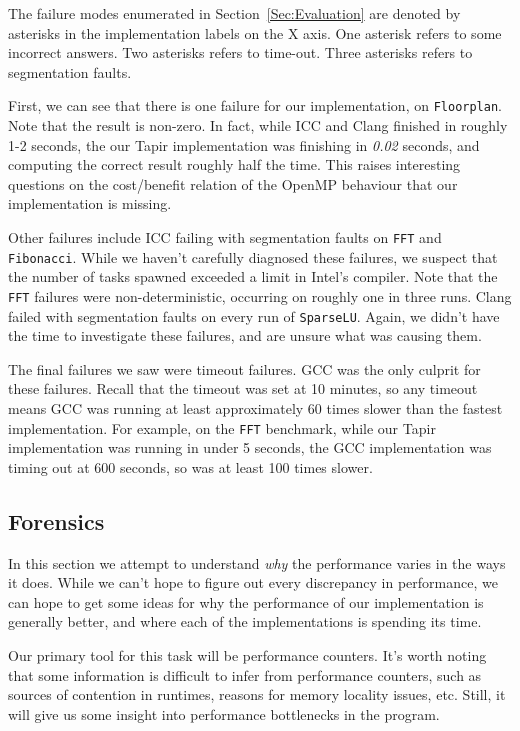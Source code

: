 \documentclass[sigconf]{acmart}
\begin{document}
The failure modes enumerated in Section~\ref{Sec:Evaluation} are denoted by 
asterisks in the implementation labels on the X axis. One asterisk refers to
some incorrect answers. Two asterisks refers to time-out. Three asterisks
refers to segmentation faults.

First, we can see that there is one failure for our implementation, on
\texttt{Floorplan}. Note that the result is non-zero. In fact, while ICC and
Clang finished in roughly 1-2 seconds, the our Tapir implementation was
finishing in \emph{0.02} seconds, and computing the correct result roughly half
the time. This raises interesting questions on the cost/benefit relation of the
OpenMP behaviour that our implementation is missing.

Other failures include ICC failing with segmentation faults on \texttt{FFT} and
\texttt{Fibonacci}. While we haven't carefully diagnosed these failures, we 
suspect that the number of tasks spawned exceeded a limit in Intel's compiler.
Note that the \texttt{FFT} failures were non-deterministic, occurring on
roughly one in three runs. Clang failed with segmentation faults on every run 
of \texttt{SparseLU}. Again, we didn't have the time to investigate these
failures, and are unsure what was causing them.

The final failures we saw were timeout failures. GCC was the only culprit for these
failures. Recall that the timeout was set at 10 minutes, so any timeout means GCC 
was running at least approximately 60 times slower than the fastest implementation. 
For example, on the \texttt{FFT} benchmark, while our Tapir implementation was running
in under 5 seconds, the GCC implementation was timing out at 600 seconds, so
was at least 100 times slower.

\subsection{Forensics}

In this section we attempt to understand \emph{why} the performance varies in the ways 
it does. While we can't hope to figure out every discrepancy in performance, we
can hope to get some ideas for why the performance of our implementation is
generally better, and where each of the implementations is spending its time.

Our primary tool for this task will be performance counters. It's worth noting
that some information is difficult to infer from performance counters, such as
sources of contention in runtimes, reasons for memory locality issues, etc.
Still, it will give us some insight into performance bottlenecks in the
program.
\end{document}
